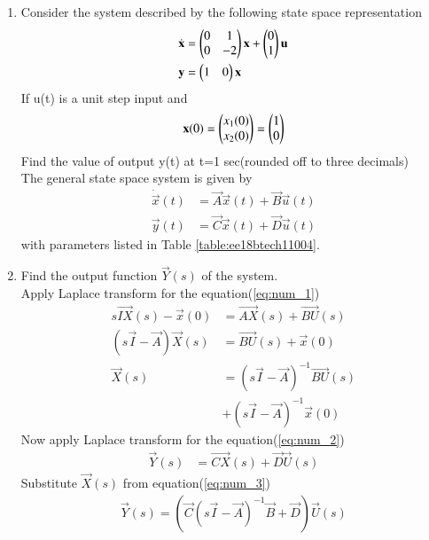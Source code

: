 \begin{enumerate}[label=\thesubsection.\arabic*.,ref=\thesubsection.\theenumi]

\item
Consider the system described by the following state space representation  
\begin{align}
\dot{\mathbf{ x}}&=\begin{pmatrix}0&1\\0&-2\end{pmatrix}\mathbf{x} + \begin{pmatrix}0\\1\end{pmatrix}\mathbf{u}\\  
\mathbf{y} &= \begin{pmatrix}1&0\end{pmatrix}\mathbf{x}
\end{align}
If u(t) is a unit step input and 
\begin{align}
\mathbf{x}(0)=\begin{pmatrix}x_{1}(0)\\x_{2}(0)\end{pmatrix}=\begin{pmatrix}1\\0\end{pmatrix}
\end{align}
Find the value of output y(t) at t=1 sec(rounded off to three decimals)
\\
\solution The general state space system is given by
\begin{align}
\dot{\vec{x}}(t)&=\vec{A}\vec{x}(t)+\vec{B}\vec{u}(t) \label{eq:num_1}\\
 \vec{y}(t)&=\vec{C}\vec{x}(t)+\vec{D} \vec{u}(t) \label{eq:num_2}
\end{align}
with parameters listed in Table \ref{table:ee18btech11004}.
\begin{table}
\centering

\caption{}
\label{table:ee18btech11004}
\end{table}
\item Find the output function $\vec{Y}(s)$ of the system.
\\
\solution Apply Laplace transform for the equation(\ref{eq:num_1})
\begin{align}
 s\vec{IX}(s)-\vec{x}(0)&= \vec{AX}(s)+ \vec{BU}(s)\\
(s\vec{I}-\vec{A})\vec{X}(s)&= \vec{BU}(s)+ \vec{x}(0)\\
\vec{X}(s)&={(s\vec{I}-\vec{A})^{-1}}\vec{B U}(s)\\ &+(s\vec{I}-\vec{A})^{-1}\vec{x}(0) \label{eq:num_3}
\end{align}
Now apply Laplace transform for the equation(\ref{eq:num_2})
\begin{align}
    \vec{Y}(s)&= \vec{CX}(s)+\vec{D}\vec{U}(s)
\end{align}
Substitute $\vec{X}(s)$ from equation(\ref{eq:num_3})
\begin{multline}
\vec{Y}(s)=( \vec{C}{(s\vec{I}-\vec{A})^{-1}}\vec{B}+\vec{D}) \vec{U}(s) 

\end{multline}
\end{enumerate}
